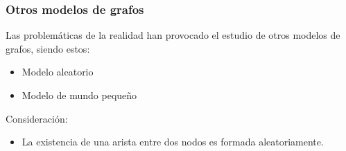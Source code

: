 \documentclass[
10pt, %
aspectratio=169, %
]{beamer}
\begin{document}
	\begin{frame}
		
		\frametitle{Otros modelos de grafos}
		
		Las problemáticas de la realidad han provocado el estudio de otros modelos de grafos, siendo estos:
		\begin{itemize}
			\item Modelo aleatorio
			\item Modelo de mundo pequeño
		\end{itemize}
		
		\vspace{2\baselineskip}
		
		Consideración:
		\begin{itemize}
			\item La existencia de una arista entre dos nodos es formada aleatoriamente.
		\end{itemize}
		
		\vspace{2\baselineskip}
		
	\end{frame}
	
\end{document}
